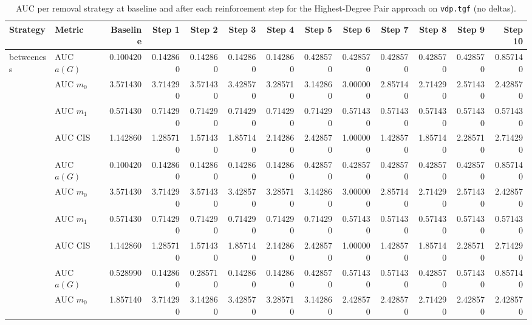 \begin{table}[htbp]
  \centering
  \caption{AUC per removal strategy at baseline and after each reinforcement step for the Highest-Degree Pair approach on \texttt{vdp.tgf} (no deltas).}
  \label{tab:vdp-highest_degree_pair-auc}
\setlength{\tabcolsep}{2.5pt}
  \begin{tabular}{llrrrrrrrrrrr}
    \toprule
    \textbf{Strategy} & \textbf{Metric} & \textbf{Baseline} & \textbf{Step 1} & \textbf{Step 2} & \textbf{Step 3} & \textbf{Step 4} & \textbf{Step 5} & \textbf{Step 6} & \textbf{Step 7} & \textbf{Step 8} & \textbf{Step 9} & \textbf{Step 10} \\
    \midrule
    \multirow{4}{*}{betweeness} & AUC $a(G)$ & 0.100420 & 0.142860 & 0.142860 & 0.142860 & 0.142860 & 0.428570 & 0.428570 & 0.428570 & 0.428570 & 0.428570 & 0.857140 \\
    & AUC $m_0$ & 3.571430 & 3.714290 & 3.571430 & 3.428570 & 3.285710 & 3.142860 & 3.000000 & 2.857140 & 2.714290 & 2.571430 & 2.428570 \\
    & AUC $m_1$ & 0.571430 & 0.714290 & 0.714290 & 0.714290 & 0.714290 & 0.714290 & 0.571430 & 0.571430 & 0.571430 & 0.571430 & 0.571430 \\
    & AUC CIS & 1.142860 & 1.285710 & 1.571430 & 1.857140 & 2.142860 & 2.428570 & 1.000000 & 1.428570 & 1.857140 & 2.285710 & 2.714290 \\
    \addlinespace
    \multirow{4}{*}{closeness} & AUC $a(G)$ & 0.100420 & 0.142860 & 0.142860 & 0.142860 & 0.142860 & 0.428570 & 0.428570 & 0.428570 & 0.428570 & 0.428570 & 0.857140 \\
    & AUC $m_0$ & 3.571430 & 3.714290 & 3.571430 & 3.428570 & 3.285710 & 3.142860 & 3.000000 & 2.857140 & 2.714290 & 2.571430 & 2.428570 \\
    & AUC $m_1$ & 0.571430 & 0.714290 & 0.714290 & 0.714290 & 0.714290 & 0.714290 & 0.571430 & 0.571430 & 0.571430 & 0.571430 & 0.571430 \\
    & AUC CIS & 1.142860 & 1.285710 & 1.571430 & 1.857140 & 2.142860 & 2.428570 & 1.000000 & 1.428570 & 1.857140 & 2.285710 & 2.714290 \\
    \addlinespace
    \multirow{4}{*}{core influence} & AUC $a(G)$ & 0.528990 & 0.142860 & 0.285710 & 0.142860 & 0.142860 & 0.428570 & 0.571430 & 0.571430 & 0.428570 & 0.571430 & 0.857140 \\
    & AUC $m_0$ & 1.857140 & 3.714290 & 3.142860 & 3.428570 & 3.285710 & 3.142860 & 2.428570 & 2.428570 & 2.714290 & 2.428570 & 2.428570 \\

\end{tabular}
\end{table}
